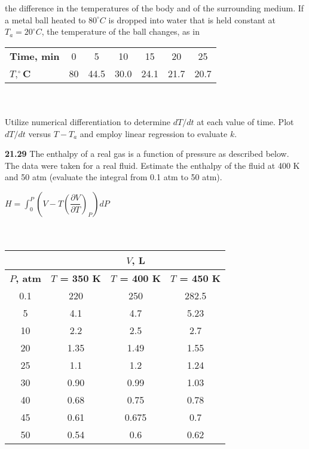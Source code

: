 \documentclass[../main.tex]{subfiles}
\begin{document}
\begin{multicols}{2}
the difference in the temperatures of the body and of the surrounding medium. If a metal ball heated to $80 ^{\circ}C$ is dropped
into water that is held constant at $T_{a} = 20 ^{\circ}C$, the temperature
of the ball changes, as in\\
\begin{tabular}{lcccccc}
	\hline

	{\textbf{Time, min}} & {0} & {5} & {10} & {15} & {20} & {25}\\
	
	{\textbf{$T,^{\circ}$C}} & {80} & {44.5} & {30.0} & {24.1} & {21.7} & {20.7}\\
	
	\hline
\end{tabular}\\
\\
Utilize numerical differentiation to determine $dT/dt$ at each
value of time. Plot $dT/dt$ versus $T - T_{a}$ and employ linear
regression to evaluate $k$.

\textbf{21.29} The enthalpy of a real gas is a function of pressure as
described below. The data were taken for a real fluid. Estimate the enthalpy of the fluid at 400 K and 50 atm (evaluate
the integral from 0.1 atm to 50 atm).

$H = \int^{P}_{0} \left(V - T \left( \dfrac{\partial V}{\partial T} \right)_{P}\right)dP  $\\
\\
\\
\begin{tabular}{cccc}
	\hline
\vspace{0,1in}

	\vspace{0,1in} & \vspace{0,1in} & $V$, L & \vspace{0,1in}\\
	
	\hline
	
	\textbf{$P$, atm} & \textbf{$T$ = 350 K} & \textbf{$T$ = 400 K} & \textbf{$T$ = 450 K}\\
	
	\hline
	
	0.1 & 220 & 250 & 282.5\\
	5 & 4.1 & 4.7 & 5.23\\
	10 & 2.2 & 2.5 & 2.7\\
	20 & 1.35 & 1.49 & 1.55\\
	25 & 1.1 & 1.2 & 1.24\\
	30 & 0.90 & 0.99 & 1.03\\
	40 & 0.68 & 0.75 & 0.78\\
	45 & 0.61 & 0.675 & 0.7\\
	50 & 0.54 & 0.6 & 0.62\\
		

\end{tabular}
\end{multicols}
\end{document}
